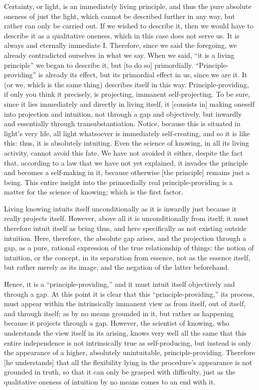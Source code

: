 Certainty, or light, is an immediately living principle,
and thus the pure absolute oneness of just the light,
which cannot be described further in any way,
but rather can only be carried out.
If we wished to describe it, then we would have to
describe it as a qualitative oneness,
which in this case does not serve us.
It is always and eternally immediate I.
Therefore, since we said the foregoing,
we already contradicted ourselves in what we say.
When we said, “it is a living principle”
we began to describe it, but [to do so] primordially.
“Principle-providing” is already its effect,
but its primordial effect in us, since we are it.
It (or we, which is the same thing) describes itself in this way.
Principle-providing, if only you think it precisely, is
projecting, immanent self-projecting.
To be sure, since it lies immediately and directly in living itself,
it [consists in] making oneself into projection and intuition,
not through a gap and objectively,
but inwardly and essentially through transubstantiation.
Notice, because this is situated in light's very life,
all light whatsoever is immediately self-creating,
and so it is like this:
thus, it is absolutely intuiting.
Even the science of knowing, in all its living activity,
cannot avoid this fate.
We have not avoided it either, despite the fact that,
according to a law that we have not yet explained,
it invades the principle and becomes a self-making in it,
because otherwise [the principle] remains just a being.
This entire insight into
the primordially real principle-providing is
a matter for the science of knowing;
which is the first factor.

Living knowing intuits itself
unconditionally as it is inwardly
just because it really projects itself.
However, above all it is unconditionally from itself;
it must therefore intuit itself as being thus,
and here specifically as not existing outside intuition.
Here, therefore, the absolute gap arises,
and the projection through a gap,
as a pure, rational expression
of the true relationship of things:
the notion of intuition,
or the concept,
in its separation from essence,
not as the essence itself,
but rather merely as its image,
and the negation of the latter beforehand.

Hence, it is a “principle-providing,”
and it must intuit itself objectively and through a gap.
At this point it is clear that this “principle-providing,”
its process, must appear within the intrinsically immanent view as
from itself, out of itself, and through itself;
as by no means grounded in it, but rather as happening
because it projects through a gap.
However, the scientist of knowing,
who understands the view itself in its arising,
knows very well all the same that this entire independence is
not intrinsically true as self-producing,
but instead is only the appearance of a higher,
absolutely unintuitable, principle-providing.
Therefore [he understands] that all the flexibility
lying in the procedure's appearance is not grounded in truth,
so that it can only be grasped with difficulty,
just as the qualitative oneness of intuition
by no means comes to an end with it.

